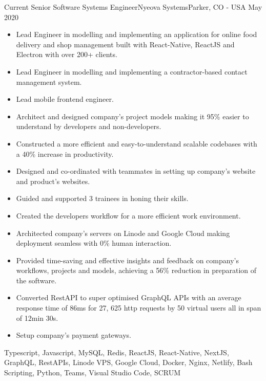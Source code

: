 %
%
%

\begin{experiences}
  
      \experience
    {Current}   {Senior Software Systems Engineer}{Nyeova Systems}{Parker, CO - USA}
    {May 2020} {
                      \begin{itemize}
                         \item	Lead Engineer in modelling and implementing an application for online food delivery and shop management built with React-Native, ReactJS and Electron with over 200+ clients.
                         \item Lead Engineer in modelling and implementing a contractor-based contact management system.
			\item Lead mobile frontend engineer.
			\item Architect and designed company's project models making it 95\% easier to understand by developers and non-developers.
			\item Constructed a more efficient and easy-to-understand scalable codebases with a 40\% increase in productivity.
			\item Designed and co-ordinated with teammates in setting up company's website and product's websites.
			\item Guided and supported 3 trainees in honing their skills.
			\item Created the developers workflow for a more efficient work environment.
			\item Architected company’s servers on Linode and Google Cloud making deployment seamless with 0\% human interaction.
			\item Provided time-saving and effective insights and feedback on company's workflows, projects and models, achieving a 56\% reduction in preparation of the software.
			\item Converted RestAPI to super optimised GraphQL APIs with an average response time of 86ms for 27, 625 http requests by 50 virtual users all in span of 12min 30s.
			\item Setup company's payment gateways.
		    \end{itemize}
                    }
                    {Typescript, Javascript, MySQL, Redis, ReactJS, React-Native, NextJS, GraphQL, RestAPIs, Linode VPS, Google Cloud, Docker, Nginx, Netlify, Bash Scripting, Python, Teams, Visual Studio Code, SCRUM}
  \emptySeparator
  

\end{experiences}
